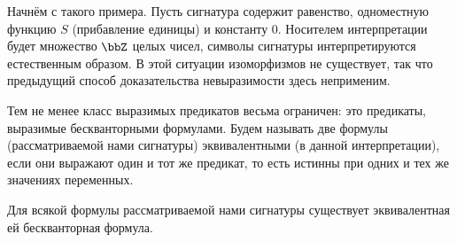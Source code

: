Начнём с такого примера.
Пусть сигнатура содержит равенство,
одноместную функцию $S$ (прибавление единицы) и константу $0$.
Носителем интерпретации будет множество $\bbZ$ целых чисел,
символы сигнатуры интерпретируются естественным образом.
В этой ситуации изоморфизмов не существует, так что предыдущий
способ доказательства невыразимости здесь неприменим.

Тем не менее класс выразимых предикатов весьма ограничен: это
предикаты, выразимые бескванторными формулами. Будем называть
две формулы (рассматриваемой нами сигнатуры) эквивалентными (в
данной интерпретации), если они выражают один и тот же предикат,
то есть истинны при одних и тех же значениях переменных.

\begin{theorem}
%
        \label{quantifier-elimination-integers-successor}%
Для всякой формулы рассматриваемой нами сигнатуры существует
эквивалентная ей бескванторная формула.
\end{theorem}

